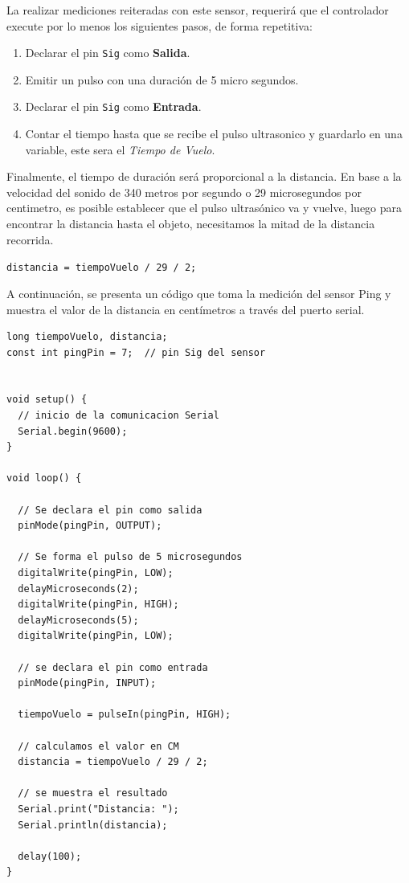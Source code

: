 \documentclass[letterpaper, 10pt]{report}
\begin{document}
La realizar mediciones reiteradas con este sensor, requerirá que el controlador execute por lo menos los siguientes pasos, de forma repetitiva:
\begin{enumerate}
\item Declarar el pin \texttt{Sig} como \textbf{Salida}.
\item Emitir un pulso con una duración de 5 micro segundos.
\item Declarar el pin \texttt{Sig} como \textbf{Entrada}.
\item Contar el tiempo hasta que se recibe el pulso ultrasonico y guardarlo en una variable, este sera el \emph{Tiempo de Vuelo}. 
\end{enumerate}

Finalmente, el tiempo de duración será proporcional a la distancia. En base a la velocidad del sonido de 340 metros por segundo o 29 microsegundos por centimetro, es posible establecer que el pulso ultrasónico va y vuelve, luego para encontrar la distancia hasta el objeto, necesitamos la mitad de la distancia recorrida.

\begin{center}
\texttt{distancia = tiempoVuelo / 29 / 2;}
\end{center}

A continuación, se presenta un código que toma la medición del sensor Ping y muestra el valor de la distancia en centímetros a través del puerto serial.

\begin{lstlisting}[style=myArduino]
long tiempoVuelo, distancia;
const int pingPin = 7;	// pin Sig del sensor


void setup() {
  // inicio de la comunicacion Serial
  Serial.begin(9600);
}

void loop() {

  // Se declara el pin como salida
  pinMode(pingPin, OUTPUT);
  
  // Se forma el pulso de 5 microsegundos
  digitalWrite(pingPin, LOW);
  delayMicroseconds(2);
  digitalWrite(pingPin, HIGH);
  delayMicroseconds(5);
  digitalWrite(pingPin, LOW);

  // se declara el pin como entrada
  pinMode(pingPin, INPUT);
  
  tiempoVuelo = pulseIn(pingPin, HIGH);

  // calculamos el valor en CM 
  distancia = tiempoVuelo / 29 / 2;

  // se muestra el resultado	
  Serial.print("Distancia: ");
  Serial.println(distancia);

  delay(100);
}
\end{lstlisting}
\end{document}
